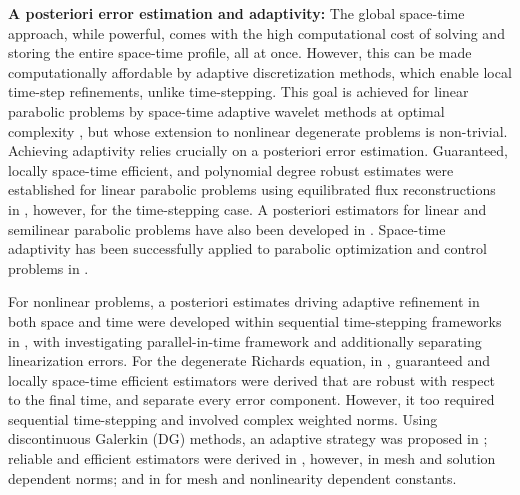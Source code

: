 \documentclass[review,11pt]{article}
\numberwithin{equation}{section}
\begin{document}
\textbf{A posteriori error estimation 
and adaptivity:} 
The global space-time approach, while powerful, comes with the high computational cost of solving and storing the entire 
space-time profile, all at once. However, this can be made computationally affordable by adaptive discretization methods, which enable local time-step refinements, unlike time-stepping. This goal is 
achieved for linear parabolic problems by space-time adaptive wavelet methods at optimal complexity \cite{schwab2009space}, but whose extension to nonlinear degenerate problems is non-trivial. Achieving adaptivity relies crucially on a posteriori error estimation. Guaranteed, locally space-time efficient, and polynomial degree robust estimates
were established for linear parabolic problems using equilibrated flux reconstructions in
\cite{ErnSmearsVohralik2017, ErnSmearsVohralik2019}, however, for the time-stepping case.  A posteriori estimators for linear and semilinear parabolic problems have also been developed in 
\cite{eriksson1991adaptive, Eriksson1995, 
schmich2008adaptivity, FUHRER202127, 
RattiVerani2019, GeorgoulisLakkisWihler2021}. 
Space-time adaptivity has been successfully applied to parabolic optimization and 
control problems in \cite{Meidner2012, gong2012space, LangerSchafelner+2022+247+266, GunzburgerKunoth2011}. 

 For nonlinear problems, a posteriori estimates driving adaptive refinement in both space and time were developed within sequential time-stepping frameworks in \cite{BernardiElAlaouiMghazli2014, 
CLEMENT2021103897}, with \cite{Dyja2018} investigating parallel-in-time framework and \cite{BARON2017104} additionally 
separating linearization errors. For the degenerate Richards equation,  in \cite{mitra2024posteriori}, guaranteed and locally space-time efficient estimators were derived that are robust with respect to the final time, and separate every error component. However, it too required sequential time-stepping and involved complex weighted norms.
Using discontinuous Galerkin (DG) methods, an adaptive strategy was proposed in \cite{DOLEJSI2019276}; reliable and efficient estimators were derived in \cite{DolejsiRoskovec2021,dolejvsi2024error}, however, in mesh and solution dependent norms; and in \cite{congreve2026residual} for mesh and nonlinearity dependent constants.
\end{document}
